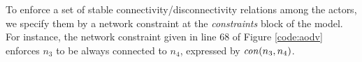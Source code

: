 To enforce a set of stable connectivity/disconnectivity relations among the actors, we specify them by a network constraint at the \emph{constraints} block of the model. For instance, the network constraint given in line $68$ of Figure \ref{code:aodv} enforces $n_3$ to be always connected to $n_4$, expressed by ${\it con}(n_3,n_4)$.  
%
%
%
%
